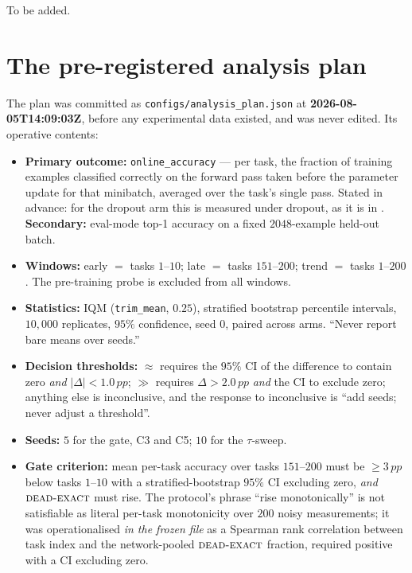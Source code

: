 \documentclass[10pt]{article}
\newcommand{\dexact}{\textsc{dead-exact}}
\newcommand{\pp}{\,pp}
\begin{document}
To be added.




\appendix
\section{The pre-registered analysis plan}
\label{app:plan}

The plan was committed as \texttt{configs/analysis\_plan.json} at
\textbf{2026-08-05T14:09:03Z}, before any experimental data existed, and was
never edited. Its operative contents:

\begin{itemize}
\item \textbf{Primary outcome:} \texttt{online\_accuracy} --- per task, the
fraction of training examples classified correctly on the forward pass taken
before the parameter update for that minibatch, averaged over the task's single
pass. Stated in advance: for the dropout arm this is measured under dropout, as
it is in \citet{dohare2024loss}. \textbf{Secondary:} eval-mode top-1 accuracy on
a fixed $2048$-example held-out batch.

\item \textbf{Windows:} early $=$ tasks $1$--$10$; late $=$ tasks $151$--$200$;
trend $=$ tasks $1$--$200$. The pre-training probe is excluded from all windows.

\item \textbf{Statistics:} IQM (\texttt{trim\_mean}, $0.25$), stratified
bootstrap percentile intervals, $10{,}000$ replicates, $95\%$ confidence, seed
$0$, paired across arms. ``Never report bare means over seeds.''

\item \textbf{Decision thresholds:} $\approx$ requires the $95\%$ CI of the
difference to contain zero \emph{and} $|\Delta| < 1.0\pp$; $\gg$ requires
$\Delta > 2.0\pp$ \emph{and} the CI to exclude zero; anything else is
inconclusive, and the response to inconclusive is ``add seeds; never adjust a
threshold''.

\item \textbf{Seeds:} $5$ for the gate, C3 and C5; $10$ for the $\tau$-sweep.

\item \textbf{Gate criterion:} mean per-task accuracy over tasks $151$--$200$
must be $\ge 3\pp$ below tasks $1$--$10$ with a stratified-bootstrap $95\%$ CI
excluding zero, \emph{and} $\dexact$ must rise. The protocol's phrase ``rise
monotonically'' is not satisfiable as literal per-task monotonicity over $200$
noisy measurements; it was operationalised \emph{in the frozen file} as a
Spearman rank correlation between task index and the network-pooled $\dexact$
fraction, required positive with a CI excluding zero.


\end{itemize}
\end{document}
